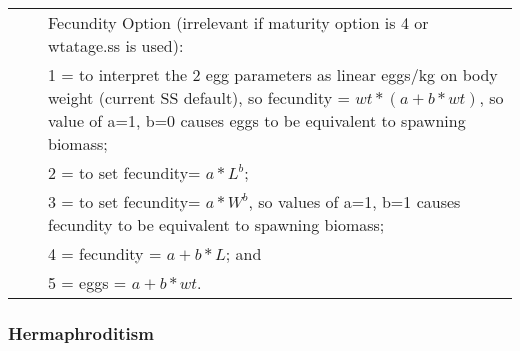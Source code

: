 \begin{longtable}{p{0.5cm} p{2cm} p{13cm}}
	\Tstrut 1 & & Fecundity Option (irrelevant if maturity option is 4 or wtatage.ss is used):\\
	  & & 1 = to  interpret the 2 egg parameters as linear eggs/kg on body weight (current SS default),  so fecundity = $wt * (a+b*wt)$,  so value of a=1, b=0 causes eggs to be equivalent to spawning biomass;\\
	  & & 2 = to set fecundity= $a*L^ b$;\\
	  & & 3 = to set fecundity= $a*W^ b$, so values of a=1, b=1 causes fecundity to be equivalent to spawning biomass;\\
	  & & 4 = fecundity = $a+b*L$; and \\
	  & & 5 = eggs = $a+b*wt$.\Bstrut\\
	\hline
\end{longtable}

\pagebreak

\subsubsection{Hermaphroditism}

